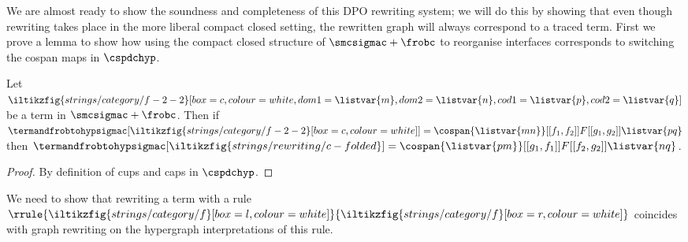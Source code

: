 We are almost ready to show the soundness and completeness of this DPO rewriting
system; we will do this by showing that even though rewriting takes place in the
more liberal compact closed setting, the rewritten graph will always correspond
to a traced term.
First we prove a lemma to show how using the compact closed structure of
\(\smcsigmac + \frobc\) to reorganise interfaces corresponds to switching the
cospan maps in \(\cspdchyp\).

\begin{lemma}\label{lem:switch-interfaces}
    Let \(
    \iltikzfig{strings/category/f-2-2}[box=c,colour=white,dom1=\listvar{m},dom2=\listvar{n},cod1=\listvar{p},cod2=\listvar{q}]
    \) be a term in \(\smcsigmac + \frobc\).
    Then if \(
    \termandfrobtohypsigmac[
        \iltikzfig{strings/category/f-2-2}[box=c,colour=white]
    ]
    =
    \cospan{\listvar{mn}}[[f_1,f_2]]{F}[[g_1,g_2]]{\listvar{pq}}
    \) then \(
    \termandfrobtohypsigmac[
        \iltikzfig{strings/rewriting/c-folded}
    ]
    =
    \cospan{\listvar{pm}}[[g_1,f_1]]{F}[[f_2,g_2]]{\listvar{nq}}
    \).
\end{lemma}
\begin{proof}
    By definition of cups and caps in \(\cspdchyp\).
\end{proof}

We need to show that rewriting a term with a rule \(\rrule{
    \iltikzfig{strings/category/f}[box=l,colour=white]
}{
    \iltikzfig{strings/category/f}[box=r,colour=white]
}\) coincides with graph rewriting on the hypergraph interpretations of
this rule.

